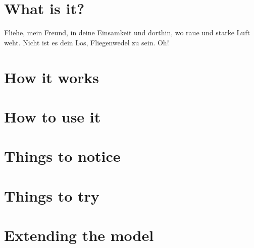 \documentclass{essay-formal}
\begin{document}
\section{What is it?}

Fliehe, mein Freund, in deine Einsamkeit und dorthin, wo raue und starke Luft weht. Nicht ist es dein Los, Fliegenwedel zu sein. Oh!

\blindtext

\section{How it works}
\section{How to use it}
\section{Things to notice}
\section{Things to try}
\section{Extending the model}
\end{document}
